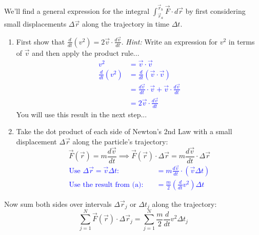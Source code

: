 \documentclass[11pt, letterpaper, openany]{book}
\newenvironment{exercise}[1][Exercise]{%
  \tcolorbox[blanker, breakable, left=1em,
    before skip=1em, after skip=1em,
    borderline west={3pt}{0pt}{PhysNavy},
    colback=PhysCream,
    before upper={\textcolor{PhysNavy}{\sffamily\bfseries #1:}\space}
  ]%
}{%
  \endtcolorbox%
}
\begin{document}
\begin{exercise}[Exercise 1]
We'll find a general expression for the integral $\int_{\vec{r}_a}^{\vec{r}_b} \vec{F} \cdot d\vec{r}$ by first considering small displacements $\Delta\vec{r}$ along the trajectory in time $\Delta t$.
\begin{enumerate}[label=(\alph*)]
    \item First show that $\frac{d}{dt}(v^2) = 2\vec{v}\cdot\frac{d\vec{v}}{dt}$. \textit{Hint:} Write an expression for $v^2$ in terms of $\vec{v}$ and then apply the product rule... \\
    \textcolor{blue}{
    \begin{align*}
        v^2 &= \vec{v} \cdot \vec{v} \\
        \frac{d}{dt}(v^2) &= \frac{d}{dt}(\vec{v} \cdot \vec{v}) \\
        &= \frac{d\vec{v}}{dt} \cdot \vec{v} + \vec{v} \cdot \frac{d\vec{v}}{dt} \\
        &= 2\vec{v} \cdot \frac{d\vec{v}}{dt}
    \end{align*}
    }
    You will use this result in the next step...
    
    \item Take the dot product of each side of Newton's 2nd Law with a small displacement $\Delta\vec{r}$ along the particle's trajectory:
    \[ \vec{F}(\vec{r}) = m\frac{d\vec{v}}{dt} \implies \vec{F}(\vec{r}) \cdot \Delta\vec{r} = m\frac{d\vec{v}}{dt} \cdot \Delta\vec{r} \]
    \textcolor{blue}{
    \begin{align*}
        \text{Use } \Delta\vec{r} = \vec{v}\Delta t: \quad &= m\frac{d\vec{v}}{dt} \cdot (\vec{v}\Delta t) \\
        \text{Use the result from (a):} \quad &= \frac{m}{2} \left( \frac{d}{dt}v^2 \right) \Delta t
    \end{align*}
    }
\end{enumerate}
\end{exercise}

Now sum both sides over intervals $\Delta\vec{r}_j$ or $\Delta t_j$ along the trajectory:
\[ \sum_{j=1}^N \vec{F}(\vec{r}) \cdot \Delta\vec{r}_j = \sum_{j=1}^N \frac{m}{2} \frac{d}{dt}v^2 \Delta t_j \]
\end{document}
